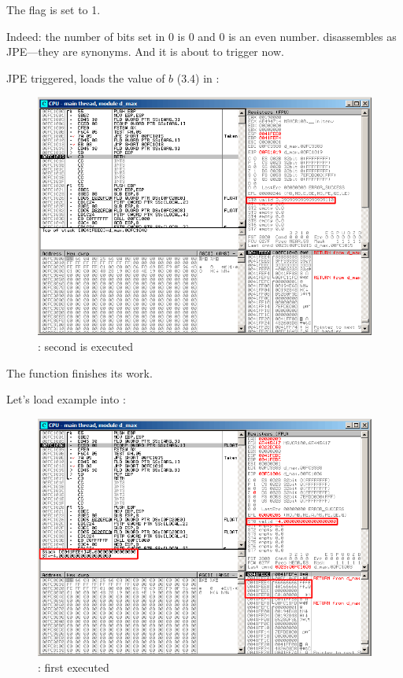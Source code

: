 The  flag is set to 1.

Indeed: the number of bits set in 0 is 0 and 0 is an even number.
\olly disassembles  as \ac{JPE}---they are synonyms.
And it is about to trigger now.

\clearpage
\ac{JPE} triggered, \FLD loads the value of $b$ (3.4) in :

\begin{figure}[H]
\centering
\includegraphics[scale=\FigScale]{patterns/12_FPU/3_comparison/x86/MSVC/olly1_5.png}
\caption{\olly: second \FLD is executed}
\label{fig:FPU_comparison_case1_olly5}
\end{figure}

The function finishes its work.

\clearpage
{}

Let's load example into \olly:

\begin{figure}[H]
\centering
\includegraphics[scale=\FigScale]{patterns/12_FPU/3_comparison/x86/MSVC/olly2_1.png}
\caption{\olly: first \FLD executed}
\label{fig:FPU_comparison_case2_olly1}
\end{figure}


